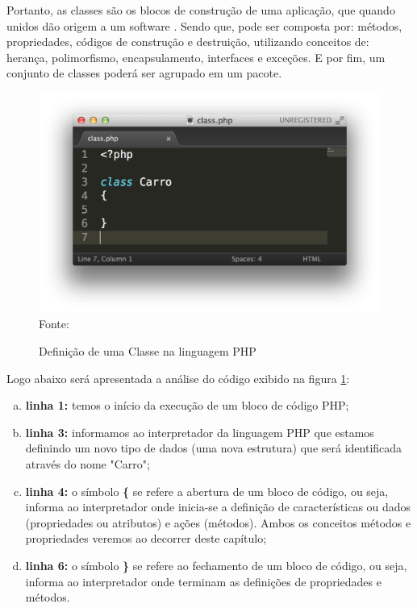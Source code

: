 Portanto, as classes são os blocos de construção de uma aplicação, que quando
unidos dão origem a um software \cite{learningJava}. Sendo que, pode ser 
composta por: métodos, propriedades, códigos de construção e destruição, 
utilizando conceitos de: herança, polimorfismo, encapsulamento, interfaces e 
exceções. E por fim, um conjunto de classes poderá ser agrupado em um pacote.

\begin{figure}[h!tb]
	\centering
	\caption{Definição de uma Classe na linguagem PHP}
	\includegraphics[width=\textwidth]{images/class.png}
	\label{fig:classe}
	\centering
	\footnotesize Fonte: \fonteOAutor
\end{figure}

\newpage

Logo abaixo será apresentada a análise do código exibido na
figura \ref{fig:classe}:

\begin{enumerate}[a)]
    \item \textbf{linha 1:} temos o início da execução de um bloco de código
    PHP;
    \item \textbf{linha 3:} informamos ao interpretador da linguagem PHP que 
    estamos definindo um novo tipo de dados (uma nova estrutura) que será 
    identificada através do nome "Carro";
    \item \textbf{linha 4:} o símbolo \textbf{\{} se refere a abertura de um
    bloco de código, ou seja, informa ao interpretador onde inicia-se a definição de 
    características ou dados (propriedades ou atributos) e ações (métodos). 
    Ambos os conceitos métodos e propriedades veremos ao decorrer deste
    capítulo;
    \item \textbf{linha 6:} o símbolo \textbf{\}} se refere ao fechamento de um
    bloco de código, ou seja, informa ao interpretador onde terminam as
    definições de propriedades e métodos.
\end{enumerate}